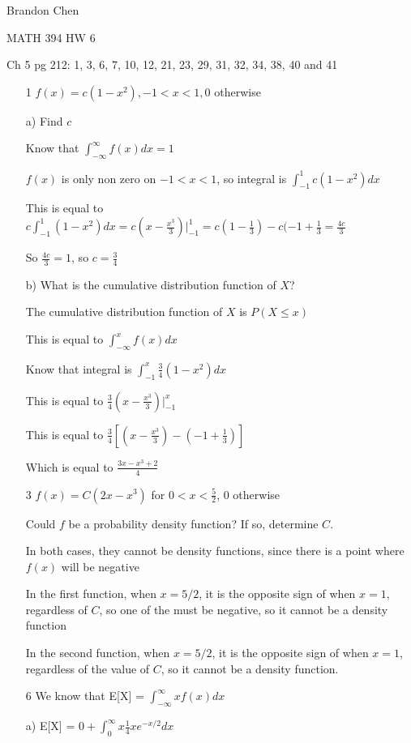 \documentclass[12pt]{article}
\begin{document}
\noindent Brandon Chen

\noindent MATH 394 HW 6

\noindent Ch 5 pg 212: 1, 3, 6, 7, 10, 12, 21, 23, 29, 31, 32, 34, 38, 40 and 41

\begin{itemize}
\item[1]
  $f(x) = c(1-x^2), -1 < x < 1, 0$ otherwise

  a) Find $c$

  Know that $\int_{-\infty}^{\infty} f(x) dx = 1$

  $f(x)$ is only non zero on $-1 < x < 1$, so integral is $\int_{-1}^{1} c(1-x^2)dx$

  This is equal to $c\int_{-1}^{1} (1-x^2)dx = c(x - \frac{x^3}{3}) \big|_{-1}^{1} = c(1 - \frac{1}{3}) - c(-1 + \frac{1}{3} = \frac{4c}{3}$

  So $\frac{4c}{3} = 1$, so $c = \frac{3}{4}$

  b) What is the cumulative distribution function of $X$?

  The cumulative distribution function of $X$ is $P(X \leq x)$

  This is equal to $\int_{-\infty}^{x} f(x)dx$

  Know that integral is $\int_{-1}^{x} \frac{3}{4} (1 - x^2) dx$

  This is equal to $\frac{3}{4} (x - \frac{x^3}{3}) \big|_{-1}^{x}$

  This is equal to $\frac{3}{4}[(x - \frac{x^3}{3}) - (-1 + \frac{1}{3})]$

  Which is equal to $\frac{3x - x^3 + 2}{4}$
\item[3]
  $f(x) = C(2x - x^3)$ for $0 < x < \frac{5}{2}$, 0 otherwise

  Could $f$ be a probability density function? If so, determine $C$.

  In both cases, they cannot be density functions, since there is a point where $f(x)$ will be negative

  In the first function, when $x = 5/2$, it is the opposite sign of when $x = 1$, regardless of $C$, so one of the must be negative, so it cannot be a density function

  In the second function, when $x = 5/2$, it is the opposite sign of when $x = 1$, regardless of the value of $C$, so it cannot be a density function.
\item[6]
  We know that E[X] = $\int_{-\infty}^{\infty} xf(x)dx$

  a) E[X] = $0 + \int_{0}^{\infty} x \frac{1}{4}xe^{-x/2} dx$


\end{itemize}
\end{document}
